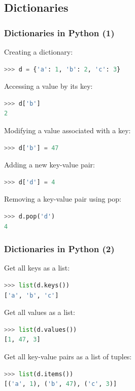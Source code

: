 \subsection{Dictionaries}
\begin{frame}[fragile]
  \frametitle{Dictionaries in Python (1)}
  Creating a dictionary:
  \begin{lstlisting}[language=Python,numbers=none]
>>> d = {'a': 1, 'b': 2, 'c': 3}
  \end{lstlisting}
  Accessing a value by its key:
  \begin{lstlisting}[language=Python,numbers=none]
>>> d['b']
2
  \end{lstlisting}
  Modifying a value associated with a key:
  \begin{lstlisting}[language=Python,numbers=none]
>>> d['b'] = 47
  \end{lstlisting}
  Adding a new key-value pair:
  \begin{lstlisting}[language=Python,numbers=none]
>>> d['d'] = 4
  \end{lstlisting}
  Removing a key-value pair using pop:
  \begin{lstlisting}[language=Python,numbers=none]
>>> d.pop('d')
4
  \end{lstlisting}
\end{frame}

\begin{frame}[fragile]
  \frametitle{Dictionaries in Python (2)}
  Get all keys as a list:
  \begin{lstlisting}[language=Python,numbers=none]
>>> list(d.keys())
['a', 'b', 'c']
  \end{lstlisting}
  Get all values as a list:
  \begin{lstlisting}[language=Python,numbers=none]
>>> list(d.values())
[1, 47, 3]
  \end{lstlisting}
  Get all key-value pairs as a list of tuples:
  \begin{lstlisting}[language=Python,numbers=none]
>>> list(d.items())
[('a', 1), ('b', 47), ('c', 3)]
  \end{lstlisting}
\end{frame}


